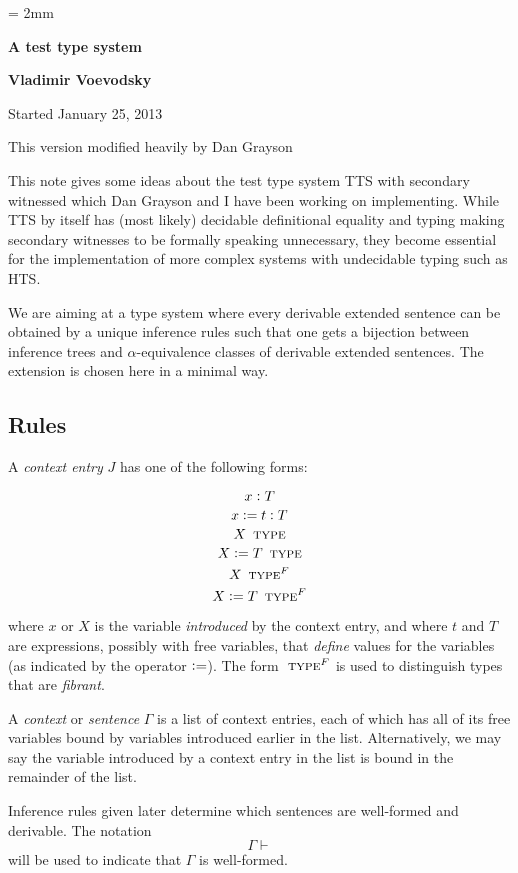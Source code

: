 \documentclass[11pt]{article}
\newcommand{\hastype}{\vcentcolon}
\newcommand{\TYPE}{\mathop{\text{ \sc type}}}
\newcommand{\FTYPE}{\mathop{\text{ \sc type}^F}}
\newcommand{\Context}{\vdash}
\newcommand{\defn}{\vcentcolon=}
\begin{document}
\parskip = 2mm
\begin{center}
{\bf\Large A test type system}

{\bf Vladimir Voevodsky}

{Started January 25, 2013}  

{This version modified heavily by Dan Grayson}  
\end{center}

\tableofcontents

This note gives some ideas about the test type system TTS with secondary
witnessed which Dan Grayson and I have been working on implementing. While TTS
by itself has (most likely) decidable definitional equality and typing making
secondary witnesses to be formally speaking unnecessary, they become essential
for the implementation of more complex systems with undecidable typing such as
HTS.

We are aiming at a type system where every derivable extended sentence can be
obtained by a unique inference rules such that one gets a bijection between
inference trees and $\alpha$-equivalence classes of derivable extended
sentences.  The extension is chosen here in a minimal way.

\subsection{Rules}

A {\em context entry} $J$ has one of the following forms:

$$ x \hastype T $$
$$ x \defn t \hastype T $$
$$ X \TYPE $$
$$ X \defn T \TYPE $$
$$ X \FTYPE $$
$$ X \defn T \FTYPE $$

where $x$ or $X$ is the variable {\em introduced} by the context entry, and
where $t$ and $T$ are expressions, possibly with free variables, that {\em
  define} values for the variables (as indicated by the operator $\defn$).  The
form $\FTYPE$ is used to distinguish types that are {\em fibrant}.

A {\em context} or {\em sentence} $\Gamma$ is a list of context entries, each of
which has all of its free variables bound by variables introduced earlier in
the list.  Alternatively, we may say the variable introduced by a context entry in
the list is bound in the remainder of the list.

Inference rules given later determine which sentences are well-formed and
derivable.  The notation $$\Gamma \Context$$ will be used to indicate that
$\Gamma$ is well-formed.
\end{document}
